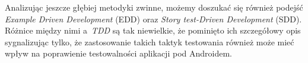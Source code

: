 Analizując jeszcze głębiej metodyki zwinne, możemy doszukać się również podejść \textit{Example Driven Development} (EDD) oraz \textit{Story test-Driven Development} (SDD). Różnice między nimi a~\textit{TDD} są tak niewielkie, że pominięto ich szczegółowy opis sygnalizując tylko, że zastosowanie takich taktyk testowania również może mieć wpływ na poprawienie testowalności aplikacji pod Androidem.  






